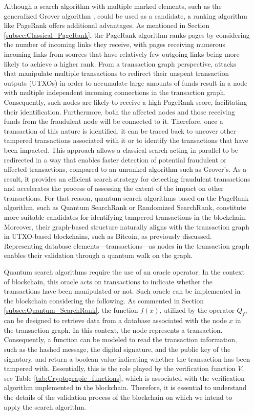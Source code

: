 \documentclass[nofootinbib,aps,prd,reprint,superscriptaddress,floatfix]{revtex4-2}
\begin{document}
Although a search algorithm with multiple marked elements, such as the generalized Grover algorithm \cite{Grover_M}, could be used as a candidate, a ranking algorithm like PageRank offers additional advantages. As mentioned in Section \ref{subsec:Classical_PageRank}, the PageRank algorithm ranks pages by considering the number of incoming links they receive, with pages receiving numerous incoming links from sources that have relatively few outgoing links being more likely to achieve a higher rank. From a transaction graph perspective, attacks that manipulate multiple transactions to redirect their unspent transaction outputs (UTXOs) in order to accumulate large amounts of funds result in a node with multiple independent incoming connections in the transaction graph. Consequently, such nodes are likely to receive a high PageRank score, facilitating their identification. Furthermore, both the affected nodes and those receiving funds from the fraudulent node will be connected to it. Therefore, once a transaction of this nature is identified, it can be traced back to uncover other tampered transactions associated with it or to identify the transactions that have been impacted. This approach allows a classical search acting in parallel to be redirected in a way that enables faster detection of potential fraudulent or affected transactions, compared to an unranked algorithm such as Grover's. As a result, it provides an efficient search strategy for detecting fraudulent transactions and accelerates the process of assessing the extent of the impact on other transactions. For that reason, quantum search algorithms based on the PageRank algorithm, such as Quantum SearchRank or Randomized SearchRank, constitute more suitable candidates for identifying tampered transactions in the blockchain. Moreover, their graph-based structure naturally aligns with the transaction graph in UTXO-based blockchains, such as Bitcoin, as previously discussed. Representing database elements—transactions—as nodes in the transaction graph enables their validation through a quantum walk on the graph. 

Quantum search algorithms require the use of an oracle operator. In the context of blockchain, this oracle acts on transactions to indicate whether the transactions have been manipulated or not. Such oracle can be implemented in the blockchain considering the following. As commented in Section \ref{subsec:Quantum_SearchRank}, the function $f(x)$, utilized by the operator $Q_{f}$, can be designed to retrieve data from a database associated with the node $x$ in the transaction graph. In this context, the node represents a transaction. Consequently, a function can be modeled to read the transaction information, such as the hashed message, the digital signature, and the public key of the signatory, and return a boolean value indicating whether the transaction has been tampered with. Essentially, this is the role played by the verification function $V$, see Table \ref{tab:Cryptograpic_functions}, which is associated with the verification algorithm implemented in the blockchain. Therefore, it is essential to understand the details of the validation process of the blockchain on which we intend to apply the search algorithm.
\end{document}

